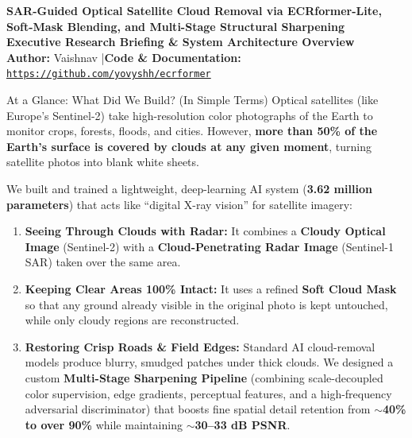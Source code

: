 \documentclass[11pt,a4paper]{article}
\begin{document}
\begin{center}
    {\LARGE\bfseries\color{primaryblue} SAR-Guided Optical Satellite Cloud Removal via ECRformer-Lite, Soft-Mask Blending, and Multi-Stage Structural Sharpening}\\[0.8em]
    {\large\textbf{Executive Research Briefing \& System Architecture Overview}}\\[0.5em]
    {\normalsize \textbf{Author:} Vaishnav \quad|\quad \textbf{Code \& Documentation:} \href{https://github.com/yovyshh/ecrformer}{\texttt{https://github.com/yovyshh/ecrformer}}}
\end{center}

\vspace{0.3em}

\begin{laymanbox}{At a Glance: What Did We Build? (In Simple Terms)}
Optical satellites (like Europe's Sentinel-2) take high-resolution color photographs of the Earth to monitor crops, forests, floods, and cities. However, \textbf{more than 50\% of the Earth's surface is covered by clouds at any given moment}, turning satellite photos into blank white sheets.

We built and trained a lightweight, deep-learning AI system (\textbf{3.62 million parameters}) that acts like ``digital X-ray vision'' for satellite imagery:
\begin{enumerate}[leftmargin=1.5em, itemsep=2pt, topsep=2pt]
    \item \textbf{Seeing Through Clouds with Radar:} It combines a \textbf{Cloudy Optical Image} (Sentinel-2) with a \textbf{Cloud-Penetrating Radar Image} (Sentinel-1 SAR) taken over the same area.
    \item \textbf{Keeping Clear Areas 100\% Intact:} It uses a refined \textbf{Soft Cloud Mask} so that any ground already visible in the original photo is kept untouched, while only cloudy regions are reconstructed.
    \item \textbf{Restoring Crisp Roads \& Field Edges:} Standard AI cloud-removal models produce blurry, smudged patches under thick clouds. We designed a custom \textbf{Multi-Stage Sharpening Pipeline} (combining scale-decoupled color supervision, edge gradients, perceptual features, and a high-frequency adversarial discriminator) that boosts fine spatial detail retention from \textbf{$\sim$40\% to over 90\%} while maintaining \textbf{$\sim$30--33 dB PSNR}.
\end{enumerate}
\end{laymanbox}
\end{document}
